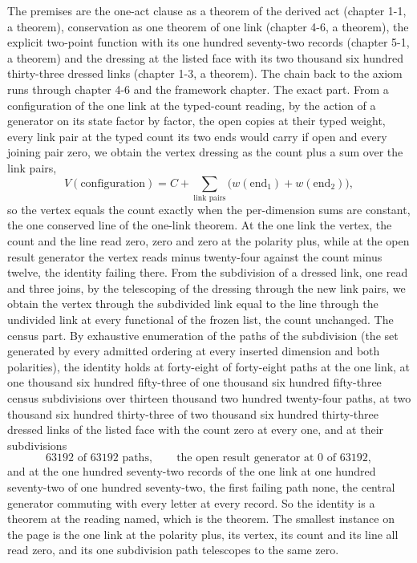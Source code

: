 \begin{chproof}
The premises are the one-act clause as a theorem of the derived act (chapter 1-1, a theorem), conservation as one theorem of one link (chapter 4-6, a theorem), the explicit two-point function with its one hundred seventy-two records (chapter 5-1, a theorem) and the dressing at the listed face with its two thousand six hundred thirty-three dressed links (chapter 1-3, a theorem). The chain back to the axiom runs through chapter 4-6 and the framework chapter. The exact part. From a configuration of the one link at the typed-count reading, by the action of a generator on its state factor by factor, the open copies at their typed weight, every link pair at the typed count its two ends would carry if open and every joining pair zero, we obtain the vertex dressing as the count plus a sum over the link pairs,
\begin{equation}
V(\text{configuration}) = C + \sum_{\text{link pairs}} \big(w(\text{end}_1) + w(\text{end}_2)\big) ,
\end{equation}
so the vertex equals the count exactly when the per-dimension sums are constant, the one conserved line of the one-link theorem. At the one link the vertex, the count and the line read zero, zero and zero at the polarity plus, while at the open result generator the vertex reads minus twenty-four against the count minus twelve, the identity failing there. From the subdivision of a dressed link, one read and three joins, by the telescoping of the dressing through the new link pairs, we obtain the vertex through the subdivided link equal to the line through the undivided link at every functional of the frozen list, the count unchanged. The census part. By exhaustive enumeration of the paths of the subdivision (the set generated by every admitted ordering at every inserted dimension and both polarities), the identity holds at forty-eight of forty-eight paths at the one link, at one thousand six hundred fifty-three of one thousand six hundred fifty-three census subdivisions over thirteen thousand two hundred twenty-four paths, at two thousand six hundred thirty-three of two thousand six hundred thirty-three dressed links of the listed face with the count zero at every one, and at their subdivisions
\begin{equation}
63192 \text{ of } 63192 \text{ paths},\qquad \text{the open result generator at } 0 \text{ of } 63192 ,
\end{equation}
and at the one hundred seventy-two records of the one link at one hundred seventy-two of one hundred seventy-two, the first failing path none, the central generator commuting with every letter at every record. So the identity is a theorem at the reading named, which is the theorem. The smallest instance on the page is the one link at the polarity plus, its vertex, its count and its line all read zero, and its one subdivision path telescopes to the same zero.


\end{chproof}
